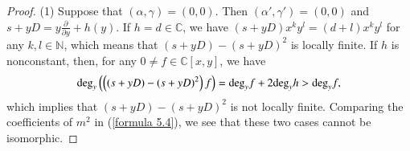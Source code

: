 \documentclass[12pt,reqno]{amsart}
\def\N{\mathbb{N}}
\def\C{\mathbb{C}}
\numberwithin{equation}{section}
\begin{document}
\begin{proof}
\rm(1) Suppose that $(\alpha,\gamma)=(0,0)$. Then $(\alpha',\gamma')=(0,0)$ and $s+yD=y\frac{\partial}{\partial{y}}+h(y)$. If $h=d\in\C$, we have $(s+yD)x^ky^l=(d+l)x^ky^l$ for any $k,l\in\N$, which means that $(s+yD)- (s+yD)^2$ is locally finite. If $h$ is nonconstant, then, for any $0\ne f\in\C[x,y]$, we have $${\rm deg}_y  \left(\left( (s+yD)- (s+yD)^2 \right)f\right)={\rm deg}_y f+2{\rm deg}_y h>{\rm deg}_y f,$$
which implies that $(s+yD)- (s+yD)^2$ is not locally finite. Comparing the coefficients of $m^2$ in (\ref{formula 5.4}), we see that these two cases cannot be isomorphic. %


\end{proof}
\end{document}
